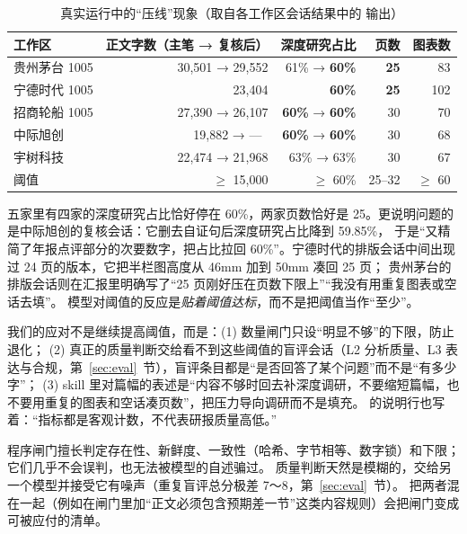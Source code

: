 \begin{table}[h]
\centering\small
\caption{真实运行中的“压线”现象（取自各工作区会话结果中的  输出）}
\label{tab:pipe-floor}
\begin{tabular}{@{}lrrrr@{}}
\toprule
工作区 & 正文字数（主笔 → 复核后） & 深度研究占比 & 页数 & 图表数 \\
\midrule
贵州茅台 1005 & 30,501 → 29,552 & 61\% → \textbf{60\%} & \textbf{25} & 83 \\
宁德时代 1005 & 23,404 & \textbf{60\%} & \textbf{25} & 102 \\
招商轮船 1005 & 27,390 → 26,107 & \textbf{60\%} → \textbf{60\%} & 30 & 70 \\
中际旭创 & 19,882 → —\ & \textbf{60\%} → \textbf{60\%} & 30 & 68 \\
宇树科技 & 22,474 → 21,968 & 63\% → 63\% & 30 & 67 \\
\midrule
阈值 & $\ge$ 15,000 & $\ge$ 60\% & 25--32 & $\ge$ 60 \\
\bottomrule
\end{tabular}
\end{table}

五家里有四家的深度研究占比恰好停在 60\%，两家页数恰好是 25。更说明问题的是中际旭创的复核会话：它删去自证句后深度研究占比降到 59.85\%，
于是“又精简了年报点评部分的次要数字，把占比拉回 60\%”。宁德时代的排版会话中间出现过 24 页的版本，它把半栏图高度从 46mm 加到 50mm 凑回 25 页；
贵州茅台的排版会话则在汇报里明确写了“25 页刚好压在页数下限上”“我没有用重复图表或空话去填”。
模型对阈值的反应是\emph{贴着阈值达标}，而不是把阈值当作“至少”。

我们的应对不是继续提高阈值，而是：(1) 数量闸门只设“明显不够”的下限，防止退化；
(2) 真正的质量判断交给看不到这些阈值的盲评会话（L2 分析质量、L3 表达与合规，第~\ref{sec:eval}~节），盲评条目都是“是否回答了某个问题”而不是“有多少字”；
(3) skill 里对篇幅的表述是“内容不够时回去补深度调研，不要缩短篇幅，也不要用重复的图表和空话凑页数”，把压力导向调研而不是填充。
 的说明行也写着：“指标都是客观计数，不代表研报质量高低。”

\begin{insight}
程序闸门擅长判定存在性、新鲜度、一致性（哈希、字节相等、数字锁）和下限；它们几乎不会误判，也无法被模型的自述骗过。
质量判断天然是模糊的，交给另一个模型并接受它有噪声（重复盲评总分极差 7～8，第~\ref{sec:eval}~节）。
把两者混在一起（例如在闸门里加“正文必须包含预期差一节”这类内容规则）会把闸门变成可被应付的清单。
\end{insight}

